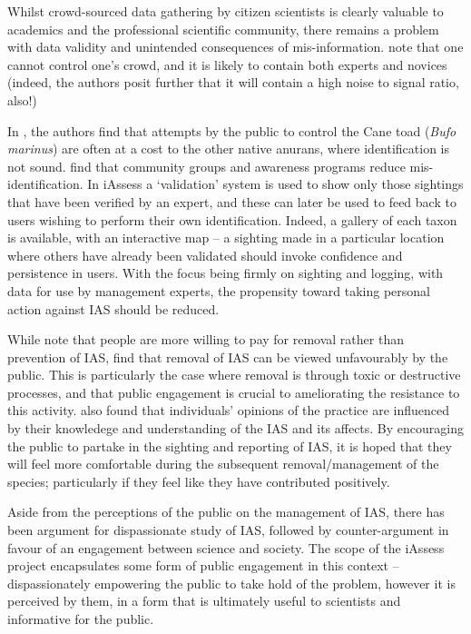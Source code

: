 \documentclass[10pt,psfig,letterpaper,twocolumn]{article}
\begin{document}
Whilst crowd-sourced data gathering by citizen scientists is clearly valuable to academics and the professional scientific community,
there remains a problem with data validity and unintended consequences of mis-information.
\citet{Schenk:2009ud} note that one cannot control one's crowd,
and it is likely to contain both experts and novices
(indeed, the authors posit further that it will contain a high noise to signal ratio, also!)

In \citet{Somaweera:2010vi}, the authors find that attempts by the public to control the Cane toad (\emph{Bufo marinus}) are often at a cost to the other native anurans, where identification is not sound.
\citet{Somaweera:2010vi} find that community groups and awareness programs reduce mis-identification.
In iAssess a `validation' system is used to show only those sightings that have been verified by an expert, and these can later be used to feed back to users wishing to perform their own identification.
Indeed, a gallery of each taxon is available, with an interactive map -- a sighting made in a particular location where others have already been validated should invoke confidence and persistence in users.
With the focus being firmly on sighting and logging, with data for use by management experts, the propensity toward taking personal action against IAS should be reduced. 

While \citet{GarciaLlorente:vx} note that people are more willing to pay for removal rather than prevention of IAS, \citet{Sharp:2011eh} find that removal of IAS can be viewed unfavourably by the public.
This is particularly the case where removal is through toxic or destructive processes, and that public engagement is crucial to ameliorating the resistance to this activity.
\citet{GarciaLlorente:vx} also found that individuals' opinions of the practice are influenced by their knowledege and understanding of the IAS and its affects.
By encouraging the public to partake in the sighting and reporting of IAS, it is hoped that they will feel more comfortable during the subsequent removal/management of the species;
particularly if they feel like they have contributed positively. 

Aside from the perceptions of the public on the management of IAS,
there has been argument \cite{Brown:2004uj} for dispassionate study of IAS,
followed by counter-argument \cite{Larson:2007vs} in favour of an engagement between science and society.
The scope of the iAssess project encapsulates some form of public engagement in this context -- dispassionately empowering the public to take hold of the problem,
however it is perceived by them, in a form that is ultimately useful to scientists and informative for the public.
\end{document}
